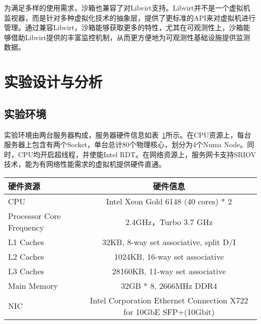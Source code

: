 为满足多样的使用需求，沙箱也兼容了对Libvirt支持。Libvirt并不是一个虚拟机监视器，而是针对多种虚拟化技术的抽象层，提供了更标准的API来对虚拟机进行管理。通过兼容Libvirt，沙箱能够获取更多的特性，尤其在可观测性上，沙箱能够借助Libvirt提供的丰富监控机制，从而更方便地为可观测性基础设施提供监测数据。


\section{实验设计与分析}

\subsection{实验环境}

实验环境由两台服务器构成，服务器硬件信息如表~\ref{tab:exp_env}所示。在CPU资源上，每台服务器上包含有两个Socket，单台总计80个物理核心，划分为4个Numa Node。同时，CPU均开启超线程，并使能Intel RDT。在网络资源上，服务网卡支持SRIOV技术，能为有网络性能需求的虚拟机提供硬件直通。

\begin{table}[H]
    \label{tab:exp_env}
    \footnotesize%
    \setlength{\tabcolsep}{4pt}%
    \renewcommand{\arraystretch}{1.25}%
    \centering
    \begin{tabular}{lc}
        \hline
        硬件资源 & 硬件信息 \\
        \hline
        CPU & Intel Xeon Gold 6148 (40 cores) * 2 \\
        Processor Core Frequency & 2.4GHz，Turbo 3.7 GHz \\
        L1 Caches & 32KB,  8-way set associative, split D/I \\
        L2 Caches & 1024KB, 16-way set associative \\
        L3 Caches & 28160KB, 11-way set associative \\
        Main Memory & 32GB * 8, 2666MHz DDR4 \\
        NIC & Intel Corporation Ethernet Connection X722 for 10GbE SFP+(10Gbit) \\
        \hline
    \end{tabular}
\end{table}

